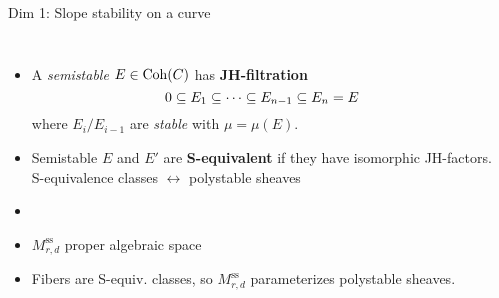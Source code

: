 \documentclass[8pt,handout]{beamer} %
\begin{document}
\begin{frame}[fragile]{Dim 1: Slope stability on a curve}
\begin{columns}[t]
    \begin{itemize}
        \item<8-> A \textit{semistable} $E \in \mathrm{Coh}(C)$ has \textbf{JH-filtration}
        \[ 0 \subseteq E_1 \subseteq \cdots \subseteq E_{n-1} \subseteq E_n = E \]
        where $E_i/E_{i-1}$ are \textit{stable} with $\mu = \mu(E)$.
        \item<10-> Semistable $E$ and $E'$ are \textbf{S-equivalent} if they have isomorphic JH-factors. \\
        S-equivalence classes $\leftrightarrow$ polystable sheaves
        \item[]
        \begin{center}
        \end{center}
        \item $M^{\text{ss}}_{r,d}$ proper algebraic space
        \item Fibers are S-equiv. classes, so $M^{\text{ss}}_{r,d}$ parameterizes polystable sheaves.
    \end{itemize}
\end{columns}
\end{frame}
\end{document}
